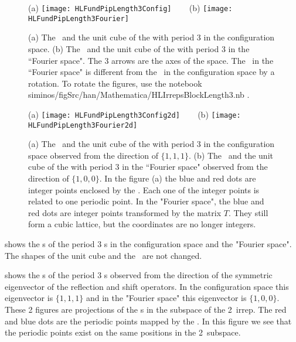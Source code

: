 \begin{description}
\begin{figure}
  \centering
{(a)}
\texttt{[image: HLFundPipLength3Config]}
~~~
{(b)}$\!\!\!\!$
\texttt{[image: HLFundPipLength3Fourier]}
\\ %

  \caption{\label{fig:HLFundPipLength3}
(a)
The \fundPip\ and the unit cube of the {\lattstate}
with period 3 in the configuration space.
(b)
The \fundPip\ and the unit cube of the {\lattstate} with period 3 in the
``Fourier space". The 3 arrows are the axes of the space. The \fundPip\
in the ``Fourier space" is different from the \fundPip\ in the
configuration space by a rotation.
To rotate the figures, use the notebook\\
{\color{red}siminos/figSrc/han/Mathematica/HLIrrepsBlockLength3.nb} .
          }
\end{figure}

\begin{figure}
  \centering
{(a)}
\texttt{[image: HLFundPipLength3Config2d]}
~~~
{(b)}$\!\!\!\!$
\texttt{[image: HLFundPipLength3Fourier2d]}
\\ %

  \caption{\label{fig:HLFundPipLength32d}
(a)
The \fundPip\ and the unit cube of the {\lattstate}
with period 3 in the configuration space observed from the direction of $\{1,1,1\}$.
(b)
The \fundPip\ and the unit cube
of the {\lattstate} with period 3 in the ``Fourier space" observed from the direction of
$\{1,0,0\}$.
In the figure (a) the blue and red dots are integer points enclosed by the \fundPip. Each one
of the integer points is related to one periodic point.
In the "Fourier space", the blue and red dots are integer points transformed by the matrix $T$.
They still form a cubic lattice, but the coordinates are no longer integers.
          }
\end{figure}

 shows the \fundPip s of the period 3 {\lattstate}s
in the configuration space and the "Fourier space". The shapes of the unit cube and
the \fundPip\ are not changed.

 shows the \fundPip s of the period 3 {\lattstate}s observed
from the direction of the symmetric eigenvector of the reflection and shift operators.
In the configuration
space this eigenvector is $\{1,1,1\}$ and in the "Fourier space" this eigenvector is $\{1,0,0\}$.
These 2 figures are projections of the \fundPip s in the subspace of the 2\dmn\ irrep. The red and
blue dots are the periodic points mapped by the \jacobianOrb. In this figure we see that the periodic points exist on the same positions in the 2\dmn\ subspace.


\end{description}
